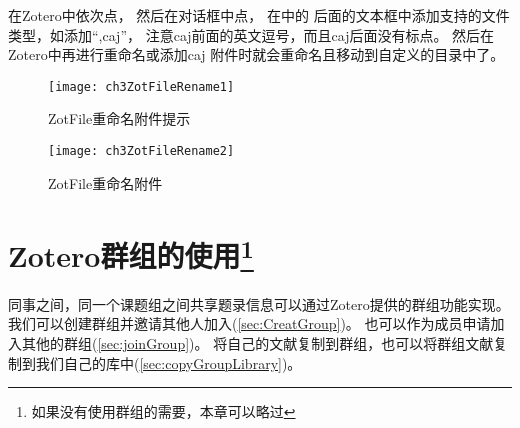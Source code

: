 \documentclass[cn,11pt,chinese]{elegantbook}
\begin{document}
\begin{enumerate}
		\quad \quad 在Zotero中依次点，
		然后在对话框中点，
		在中的
		后面的文本框中添加支持的文件类型，如添加“,caj”，
		注意caj前面的英文逗号，而且caj后面没有标点。
		然后在Zotero中再进行重命名或添加caj
		附件时就会重命名且移动到自定义的目录中了。

	
			\begin{figure}[htbp]
				\centering
				\texttt{[image: ch3ZotFileRename1]}
				\caption{ZotFile重命名附件提示}
				\label{fig:ch3ZotFileRename1}
			\end{figure}
			\begin{figure}[htbp]
				\centering
				\texttt{[image: ch3ZotFileRename2]}
				\caption{ZotFile重命名附件}
				\label{fig:ch3ZotFileRename2}
			\end{figure}
		\end{enumerate}


  \chapter[Zotero群组的使用]{Zotero群组的使用\footnote{如果没有使用群组的需要，本章可以略过}}\label{ch:group}
	同事之间，同一个课题组之间共享题录信息可以通过Zotero提供的群组功能实现。
	我们可以创建群组并邀请其他人加入(\cref{sec:CreatGroup})。
	也可以作为成员申请加入其他的群组(\cref{sec:joinGroup})。
	将自己的文献复制到群组，也可以将群组文献复制到我们自己的库中(\cref{sec:copyGroupLibrary})。


   
\end{document}
